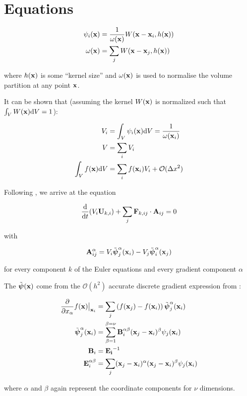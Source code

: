 

\section{Equations}



\begin{align}
\psi_i(\x) &= \frac{1}{\omega(\x)} W(\x - \x_i, h(\x))		\label{psi} \\
\omega(\x) &= \sum_j W(\x - \x_j, h(\x)) 					\label{omega}
\end{align}

where $h(\mathbf{x})$ is some ``kernel size'' and $\omega(\mathbf{x})$ is used to normalise the volume partition at any point $\mathbf{x}$.





It can be shown that (assuming the kernel $W(\mathbf{x})$ is normalized such that $\int_V W(\mathbf{x}) \mathrm{d} V = 1$):

\begin{align}
V_i &= \int_V \psi_i(\x) \de V = \frac{1}{\omega(\x_i)} \\ 					\label{psi_volume_integral}
V &= \sum_i V_i \\
\int_V f(\x) \D V &= \sum_i f(\x_i) V_i + \mathcal{O}(\Delta x ^2) 	\label{vol_integral_fx}
\end{align}
	


Following \cite{hopkinsGIZMONewClass2015}, we arrive at the equation

\begin{equation}
\frac{\D}{\D t} (V_i \U_{k,i}) + \sum_j \F_{k,ij} \cdot \Aijm = 0
\end{equation}


with

\begin{equation}
\mathbf{A}_{ij}^\alpha = V_i \tilde{\boldsymbol{\psi}}_j^\alpha (\mathbf{x}_i) - V_j\tilde{\boldsymbol{\psi}}_i^\alpha (\mathbf{x}_j) 			\label{Hopkins}
\end{equation}

for every component $k$ of the Euler equations and every gradient component $\alpha$

The $\tilde{\boldsymbol{\psi}}(\mathbf{x})$ come from the $\mathcal{O}(h^2)$ accurate discrete gradient expression from \cite{lansonRenormalizedMeshfreeSchemes2008}:

\begin{align}
\frac{\del}{\del x_{\alpha}} f(\x) \big{|}_{\x_i} &= 
\sum_j \left( f(\x_j) - f(\x_i) \right) \psitilde_j^\alpha (\x_i) 	\\		\label{gradient}
\psitilde_j^\alpha (\x_i) &= \sum_{\beta = 1}^{\beta=\nu} \mathbf{B}_i^{\alpha \beta} 
(\x_j - \x_i)^\beta \psi_j(\x_i) 	\\
\mathbf{B}_i &= \mathbf{E_i} ^ {-1} \\ 
\mathbf{E}_i^{\alpha \beta} &= \sum_j (\x_j - \x_i)^\alpha (\x_j - \x_i)^\beta \psi_j(\x_i)
\end{align}



where $\alpha$ and $\beta$ again represent the coordinate components for $\nu$ dimensions.




